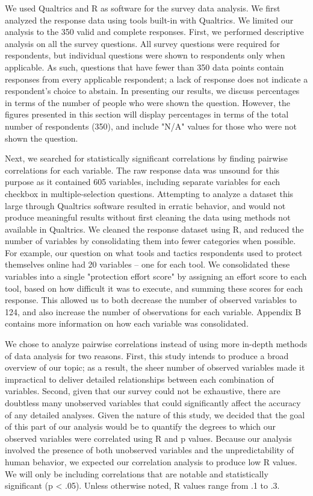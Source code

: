 We used Qualtrics and R as software for the survey data analysis. We first analyzed the
response data using tools built-in with Qualtrics. We limited our analysis to
the 350 valid and complete responses. First, we performed descriptive analysis on all the survey questions. All survey questions were required for respondents, but individual questions
were shown to respondents only when applicable. As such, questions that have
fewer than 350 data points contain responses from every applicable respondent;
a lack of response does not indicate a respondent's choice to abstain. In
presenting our results, we discuss percentages in terms of the number of
people who were shown the question. However, the figures presented in this
section will display percentages in terms of the total number of respondents
(350), and include "N/A" values for those who were not shown the question.

Next, we searched for statistically
significant correlations by finding pairwise correlations for each variable.
The raw response data was unsound for this purpose as it contained 605
variables, including separate variables for each checkbox in
multiple-selection questions. Attempting to analyze a dataset this large
through Qualtrics software resulted in erratic behavior, and would not produce
meaningful results without first cleaning the data using methods not available
in Qualtrics. We cleaned the response dataset using R, and reduced the number
of variables by consolidating them into fewer categories when possible. For
example, our question on what tools and tactics respondents used to protect
themselves online had 20 variables -- one for each tool. We consolidated these
variables into a single "protection effort score" by assigning an effort score
to each tool, based on how difficult it was to execute, and summing these
scores for each response. This allowed us to both decrease the number of
observed variables to 124, and also increase the number of observations for
each variable. Appendix B contains more information on how each variable was
consolidated. 

We chose to analyze pairwise correlations instead of using more in-depth
methods of data analysis for two reasons. First, this study intends to produce
a broad overview of our topic; as a result, the sheer number of observed
variables made it impractical to deliver detailed relationships between each
combination of variables. Second, given that our survey could not be
exhaustive, there are doubtless many unobserved variables that could
significantly affect the accuracy of any detailed analyses. Given the nature
of this study, we decided that the goal of this part of our analysis would be
to quantify the degrees to which our observed variables were correlated using
R and p values. Because our analysis involved the presence of both unobserved variables and
the unpredictability of human behavior, we expected our correlation analysis
to produce low R values. We will only be including correlations that are
notable and statistically significant (p < .05). Unless otherwise noted, R
values range from .1 to .3. 

